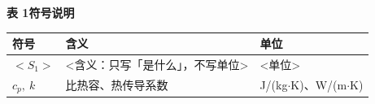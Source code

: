 \setlength{\LTleft}{\fill}
\setlength{\LTright}{\fill}
\par\vspace{0.25\baselineskip}
{\centering\fontsize{10.5pt}{12.6pt}\selectfont\bfseries 表 1\quad 符号说明\par}
\nopagebreak
\vspace{0.5em}
{\small
  \setlength{\lineskiplimit}{0pt}%
  \setlength{\lineskip}{\baselineskip}%
  \renewcommand{\arraystretch}{1.0}%
  \begin{longtable}{@{}L{0.19\textwidth}C{0.57\textwidth}R{0.19\textwidth}@{}}
    \endfirsthead
    \endhead
    \bottomrule
    \endlastfoot
    \toprule
    符号 & 含义 & 单位 \\
    \midrule
    $<S_1>$ & <含义：只写「是什么」，不写单位> & <单位> \\
    $c_p,\ k$ & 比热容、热传导系数 & J/(kg$\cdot$K)、W/(m$\cdot$K) \\
  \end{longtable}}

